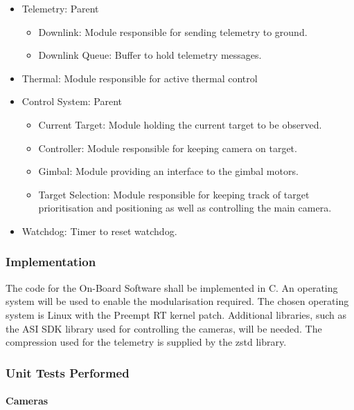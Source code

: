 \begin{itemize}
	\item Telemetry: Parent
		\begin{itemize}
			\item Downlink: Module responsible for sending telemetry to ground.
			\item Downlink Queue: Buffer to hold telemetry messages.
		\end{itemize}

	\item Thermal: Module responsible for active thermal control

	\item Control System: Parent
		\begin{itemize}
			\item Current Target: Module holding the current target to be observed.
			\item Controller: Module responsible for keeping camera on target.
			\item Gimbal: Module providing an interface to the gimbal motors.
			\item Target Selection: Module responsible for keeping track of target prioritisation and positioning as well as controlling the main camera.
		\end{itemize}

	\item Watchdog: Timer to reset watchdog.

\end{itemize}

\subsubsection{Implementation}

The code for the On-Board Software shall be implemented in C. An operating system will be used to enable the modularisation required. The chosen operating system is Linux with the Preempt RT kernel patch. Additional libraries, such as the ASI SDK library used for controlling the cameras, will be needed. The compression used for the telemetry is supplied by the zstd library.

\subsubsection{Unit Tests Performed}

\paragraph{Cameras}

